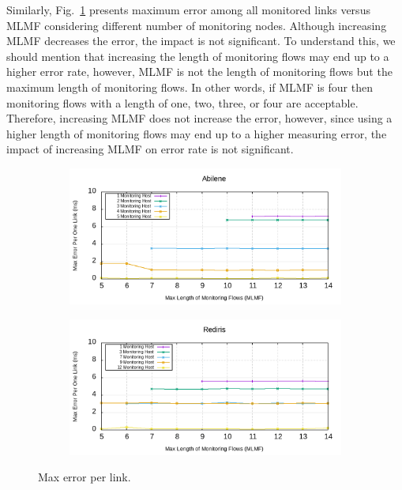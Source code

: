 \documentclass[10pt, journal, letterpaper]{IEEEtran}
\begin{document}
Similarly, Fig.~\ref{fig:max_error_abilen} presents maximum error among all monitored links versus MLMF considering different number of monitoring nodes. Although increasing MLMF decreases the error, the impact is not significant. To understand this, we should mention that increasing the length of monitoring flows may end up to a higher error rate, however, MLMF is not the length of monitoring flows but the maximum length of monitoring flows. In other words, if MLMF is four then monitoring flows with a length of one, two, three, or four are acceptable. Therefore, increasing MLMF does not increase the error, however, since using a higher length of monitoring flows may end up to a higher measuring error, the impact of increasing MLMF on error rate is not significant.
\begin{figure}
    \begin{subfigure}{\columnwidth}
       \centering
        \includegraphics[width=.8\columnwidth]{img/eval_Abilene_Max_Length_of_Max_error_per_one_link.png}
    \end{subfigure}
    \begin{subfigure}{\columnwidth}
      \centering
      \includegraphics[width=.8\columnwidth]{img/eval_Rediris_Max_Length_of_Max_error_per_one_link.png}
    \end{subfigure}
    \caption{Max error per link.}
    \label{fig:max_error_abilen}
\end{figure} 
\end{document}
